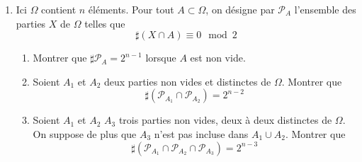 \begin{enumerate}
\item Ici $\Omega$ contient $n$ éléments. Pour tout $A \subset \Omega$, on désigne par $\mathcal P_A$ l'ensemble des parties $X$ de $\Omega$ telles que 
\begin{displaymath}
 \sharp(X\cap A) \equiv 0 \mod 2
\end{displaymath}
\begin{enumerate}
 \item Montrer que $\sharp \mathcal P_A = 2^{n-1}$ lorsque $A$ est non vide.
\item Soient $A_1$ et $A_2$ deux parties non vides et distinctes de $\Omega$. Montrer que
\begin{displaymath}
 \sharp \left( \mathcal P_{A_1}\cap \mathcal P_{A_2}\right) = 2^{n-2}
\end{displaymath}
\item Soient $A_1$ et $A_2$ $A_3$ trois parties non vides, deux à deux distinctes de $\Omega$. On suppose de plus que $A_3$ n'est pas incluse dans $A_1\cup A_2$. Montrer que
\begin{displaymath}
 \sharp \left( \mathcal P_{A_1}\cap \mathcal P_{A_2} \cap \mathcal P_{A_3}\right) = 2^{n-3}
\end{displaymath}
\end{enumerate}
\end{enumerate}


